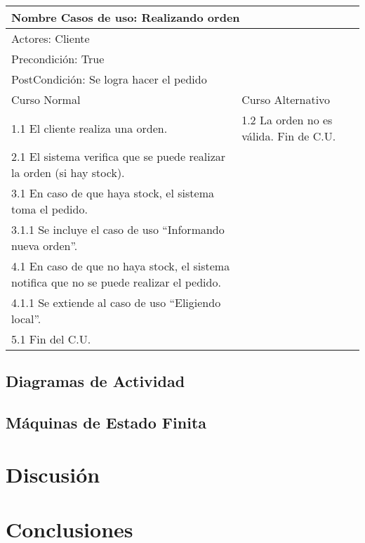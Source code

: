 \documentclass[a4paper,10pt]{article}
\begin{document}
\begin{center}
\begin{tabularx}{14cm}{|X|X|}
\hline
\multicolumn{2}{|l|}{Nombre Casos de uso: Realizando orden}\\
\hline
\multicolumn{2}{|l|}{Actores: Cliente}\\
\hline
\multicolumn{2}{|l|}{Precondici\'on: True}\\
\hline
\multicolumn{2}{|l|}{PostCondici\'on: Se logra hacer el pedido}\\
\hline
Curso Normal & Curso Alternativo\\
\hline
1.1 El cliente realiza una orden. & 1.2 La orden no es válida. Fin de C.U.
\\
\hline
2.1 El sistema verifica que se puede realizar la orden (si hay stock). &
\\
\hline
3.1 En caso de que haya stock, el sistema toma el pedido. &
\\
\hline
3.1.1 Se incluye el caso de uso ``Informando nueva orden''. &
\\
\hline
4.1 En caso de que no haya stock, el sistema notifica que no se puede realizar el pedido. &
\\
\hline
4.1.1 Se extiende al caso de uso ``Eligiendo local''. &
\\
\hline
5.1 Fin del C.U. & \\
\hline
\end{tabularx}
\end{center}

\subsection*{Diagramas de Actividad}

\subsection*{M\'aquinas de Estado Finita}


\newpage


\section*{Discusi\'on}




\newpage
\section*{Conclusiones}
\end{document}
